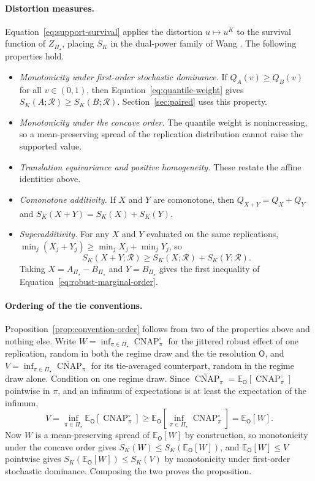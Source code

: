 \documentclass[11pt]{article}
\newcommand{\CNAP}{\operatorname{CNAP}}
\newcommand{\Regime}{\mathcal{R}}
\newcommand{\PSet}{\Pi_\star}
\newcommand{\E}{\mathbb{E}}
\newcommand{\CNAPta}{\widetilde{\CNAP}}
\newcommand{\Rank}{\mathsf{O}}
\newcommand{\CNAPj}{\CNAP^{\circ}}
\theoremstyle{remark}
\begin{document}
\paragraph{Distortion measures.}
Equation~\eqref{eq:support-survival} applies the distortion $u\mapsto u^{K}$ to the survival function of $Z_{\PSet}$, placing $S_K$ in the dual-power family of Wang \cite{wang1996premium}. The following properties hold.

\begin{itemize}
\item \emph{Monotonicity under first-order stochastic dominance.} If $Q_A(v)\geq Q_B(v)$ for all $v\in(0,1)$, then Equation~\eqref{eq:quantile-weight} gives $S_K(A;\Regime)\geq S_K(B;\Regime)$. Section~\ref{sec:paired} uses this property.
\item \emph{Monotonicity under the concave order.} The quantile weight is nonincreasing, so a mean-preserving spread of the replication distribution cannot raise the supported value.
\item \emph{Translation equivariance and positive homogeneity.} These restate the affine identities above.
\item \emph{Comonotone additivity.} If $X$ and $Y$ are comonotone, then $Q_{X+Y}=Q_X+Q_Y$ and $S_K(X+Y)=S_K(X)+S_K(Y)$.
\item \emph{Superadditivity.} For any $X$ and $Y$ evaluated on the same replications, $\min_j(X_j+Y_j)\geq\min_jX_j+\min_jY_j$, so
\[
S_K(X+Y;\Regime)
\geq
S_K(X;\Regime)+S_K(Y;\Regime).
\]
Taking $X=A_{\PSet}-B_{\PSet}$ and $Y=B_{\PSet}$ gives the first inequality of Equation~\eqref{eq:robust-marginal-order}.
\end{itemize}

\paragraph{Ordering of the tie conventions.}
Proposition~\ref{prop:convention-order} follows from two of the properties above and nothing else. Write $W=\inf_{\pi\in\PSet}\CNAPj_\pi$ for the jittered robust effect of one replication, random in both the regime draw and the tie resolution $\Rank$, and $V=\inf_{\pi\in\PSet}\CNAPta_\pi$ for its tie-averaged counterpart, random in the regime draw alone. Condition on one regime draw. Since $\CNAPta_\pi=\E_{\Rank}[\CNAPj_\pi]$ pointwise in $\pi$, and an infimum of expectations is at least the expectation of the infimum,
\[
V
=
\inf_{\pi\in\PSet}\E_{\Rank}\left[\CNAPj_\pi\right]
\geq
\E_{\Rank}\left[\inf_{\pi\in\PSet}\CNAPj_\pi\right]
=
\E_{\Rank}[W].
\]
Now $W$ is a mean-preserving spread of $\E_{\Rank}[W]$ by construction, so monotonicity under the concave order gives $S_K(W)\leq S_K(\E_{\Rank}[W])$, and $\E_{\Rank}[W]\leq V$ pointwise gives $S_K(\E_{\Rank}[W])\leq S_K(V)$ by monotonicity under first-order stochastic dominance. Composing the two proves the proposition.
\end{document}
